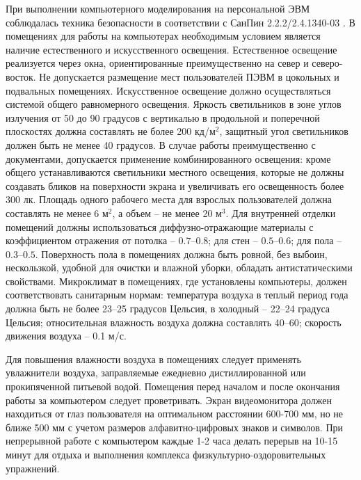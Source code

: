 \SafetyRules
При выполнении компьютерного моделирования на персональной
ЭВМ соблюдалась техника безопасности в
соответствии с СанПин 2.2.2/2.4.1340-03 \cite{SanPin}.  В помещениях для работы на
компьютерах необходимым условием является наличие естественного и искусственного
освещения.  Естественное освещение реализуется через окна, ориентированные
преимущественно на север и северо-восток. Не допускается размещение мест
пользователей ПЭВМ в цокольных и подвальных помещениях.  Искусственное освещение
должно осуществляться системой общего равномерного освещения. Яркость
светильников в зоне углов излучения от 50 до 90 градусов с вертикалью в
продольной и поперечной плоскостях должна составлять не более 200 кд/м$^2$,
защитный угол светильников должен быть не менее 40 градусов. В случае работы
преимущественно с документами, допускается применение комбинированного
освещения: кроме общего устанавливаются светильники местного освещения, которые
не должны создавать бликов на поверхности экрана и увеличивать его освещенность
более 300 лк.  Площадь одного рабочего места для взрослых пользователей должна
составлять не менее 6 м$^2$, а объем – не менее 20 м$^3$.  Для внутренней отделки
помещений должны использоваться диффузно-отражающие материалы с коэффициентом
отражения от потолка – $0.7–0.8$; для стен – $0.5–0.6$; для пола – $0.3–0.5$.
Поверхность пола в помещениях должна быть ровной, без выбоин, нескользкой,
удобной для очистки и влажной уборки, обладать антистатическими свойствами.
Микроклимат в помещениях, где установлены компьютеры, должен соответствовать
санитарным нормам: температура воздуха в теплый период года должна быть не более
23–25 градусов Цельсия, в холодный – 22–24 градуса Цельсия; относительная
влажность воздуха должна составлять 40–60; скорость движения воздуха – 0.1 м/с.

Для повышения влажности воздуха в помещениях следует применять увлажнители
воздуха, заправляемые ежедневно дистиллированной или прокипяченной питьевой
водой. Помещения перед началом и после окончания работы за компьютером следует
проветривать.  Экран видеомонитора должен находиться от глаз пользователя на
оптимальном расстоянии 600-700 мм, но не ближе 500 мм с учетом размеров
алфавитно-цифровых знаков и символов. При непрерывной работе с компьютером
каждые 1-2 часа делать перерыв на 10-15 минут для отдыха и выполнения комплекса
физкультурно-оздоровительных упражнений.
